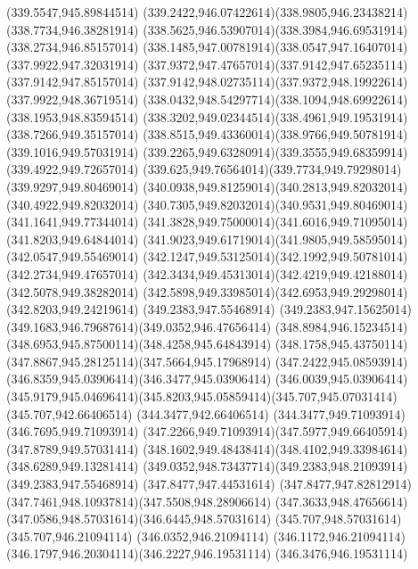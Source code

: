 {{	\lineto(339.5547,945.89844514)
	\curveto(339.2422,946.07422614)(338.9805,946.23438214)(338.7734,946.38281914)
	\curveto(338.5625,946.53907014)(338.3984,946.69531914)(338.2734,946.85157014)
	\curveto(338.1485,947.00781914)(338.0547,947.16407014)(337.9922,947.32031914)
	\curveto(337.9372,947.47657014)(337.9142,947.65235114)(337.9142,947.85157014)
	\curveto(337.9142,948.02735114)(337.9372,948.19922614)(337.9922,948.36719514)
	\curveto(338.0432,948.54297714)(338.1094,948.69922614)(338.1953,948.83594514)
	\curveto(338.3202,949.02344514)(338.4961,949.19531914)(338.7266,949.35157014)
	\curveto(338.8515,949.43360014)(338.9766,949.50781914)(339.1016,949.57031914)
	\curveto(339.2265,949.63280914)(339.3555,949.68359914)(339.4922,949.72657014)
	\curveto(339.625,949.76564014)(339.7734,949.79298014)(339.9297,949.80469014)
	\curveto(340.0938,949.81259014)(340.2813,949.82032014)(340.4922,949.82032014)
	\curveto(340.7305,949.82032014)(340.9531,949.80469014)(341.1641,949.77344014)
	\curveto(341.3828,949.75000014)(341.6016,949.71095014)(341.8203,949.64844014)
	\curveto(341.9023,949.61719014)(341.9805,949.58595014)(342.0547,949.55469014)
	\curveto(342.1247,949.53125014)(342.1992,949.50781014)(342.2734,949.47657014)
	\curveto(342.3434,949.45313014)(342.4219,949.42188014)(342.5078,949.38282014)
	\curveto(342.5898,949.33985014)(342.6953,949.29298014)(342.8203,949.24219614)
	\closepath
	\moveto(349.2383,947.55468914)
	\curveto(349.2383,947.15625014)(349.1683,946.79687614)(349.0352,946.47656414)
	\curveto(348.8984,946.15234514)(348.6953,945.87500114)(348.4258,945.64843914)
	\curveto(348.1758,945.43750114)(347.8867,945.28125114)(347.5664,945.17968914)
	\curveto(347.2422,945.08593914)(346.8359,945.03906414)(346.3477,945.03906414)
	\lineto(346.0039,945.03906414)
	\curveto(345.9179,945.04696414)(345.8203,945.05859414)(345.707,945.07031414)
	\lineto(345.707,942.66406514)
	\lineto(344.3477,942.66406514)
	\lineto(344.3477,949.71093914)
	\lineto(346.7695,949.71093914)
	\curveto(347.2266,949.71093914)(347.5977,949.66405914)(347.8789,949.57031414)
	\curveto(348.1602,949.48438414)(348.4102,949.33984614)(348.6289,949.13281414)
	\curveto(349.0352,948.73437714)(349.2383,948.21093914)(349.2383,947.55468914)
	\closepath
	\moveto(347.8477,947.44531614)
	\curveto(347.8477,947.82812914)(347.7461,948.10937814)(347.5508,948.28906614)
	\curveto(347.3633,948.47656614)(347.0586,948.57031614)(346.6445,948.57031614)
	\lineto(345.707,948.57031614)
	\lineto(345.707,946.21094114)
	\lineto(346.0352,946.21094114)
	\curveto(346.1172,946.21094114)(346.1797,946.20304114)(346.2227,946.19531114)
	\lineto(346.3476,946.19531114)
}}
